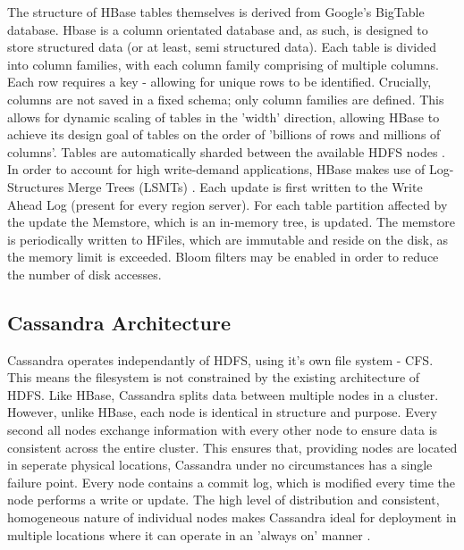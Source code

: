 \documentclass[10pt]{article}
\begin{document}
The structure of HBase tables themselves is derived from Google's BigTable database. Hbase is a column orientated database and, as such, is designed to store structured data (or at least, semi structured data). Each table is divided into column families, with each column family comprising of multiple columns. Each row requires a key - allowing for unique rows to be identified. Crucially, columns are not saved in a fixed schema; only column families are defined. This allows for dynamic scaling of tables in the 'width' direction, allowing HBase to achieve its design goal of tables on the order of 'billions of rows and millions of columns'. Tables are automatically sharded between the available HDFS nodes \citep{hbaseref}.\\

In order to account for high write-demand applications, HBase makes use of Log-Structures Merge Trees (LSMTs)  \citep{hbaseref}. Each update is first written to the Write Ahead Log (present for every region server). For each table partition affected by the update the Memstore, which is an in-memory tree, is updated. The memstore is periodically written to HFiles,  which are immutable and reside on the disk, as the memory limit is exceeded. Bloom filters may be enabled in order to reduce the number of disk accesses.\\

\subsection{Cassandra Architecture}
Cassandra operates independantly of HDFS, using it's own file system - CFS. This means the filesystem is not constrained by the existing architecture of HDFS. Like HBase, Cassandra splits data between multiple nodes in a cluster. However, unlike HBase, each node is identical in structure and purpose. Every second all nodes exchange information with every other node to ensure data is consistent across the entire cluster. This ensures that, providing nodes are located in seperate physical locations, Cassandra under no circumstances has a single failure point. Every node contains a commit log, which is modified every time the node performs a write or update. The high level of distribution and consistent, homogeneous nature of individual nodes makes Cassandra ideal for deployment in multiple locations where it can operate in an 'always on' manner \citep{cassandraarch}.\\
\end{document}
